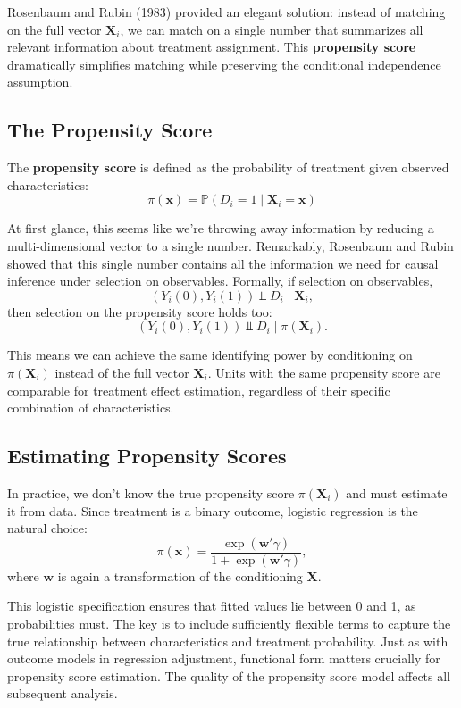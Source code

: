 \documentclass[12pt]{article}
\begin{document}
\begin{multicols}{2}
Rosenbaum and Rubin (1983) provided an elegant solution: instead of matching on the full vector $\bm{X}_i$, we can match on a single number that summarizes all relevant information about treatment assignment.
This \textbf{propensity score} dramatically simplifies matching while preserving the conditional independence assumption.

\subsection*{The Propensity Score}

The \textbf{propensity score} is defined as the probability of treatment given observed characteristics:
$$\pi(\bm{x}) = \mathbb{P}(D_i = 1 \mid \bm{X}_i = \bm{x})$$

At first glance, this seems like we're throwing away information by reducing a multi-dimensional vector to a single number.
Remarkably, Rosenbaum and Rubin showed that this single number contains all the information we need for causal inference under selection on observables.
Formally, if selection on observables, 
$$(Y_i(0), Y_i(1)) \Perp D_i \mid \bm{X}_i,$$ 
then selection on the propensity score holds too: 
$$(Y_i(0), Y_i(1)) \Perp D_i \mid \pi(\bm{X}_i).$$

This means we can achieve the same identifying power by conditioning on $\pi(\bm{X}_i)$ instead of the full vector $\bm{X}_i$.
Units with the same propensity score are comparable for treatment effect estimation, regardless of their specific combination of characteristics.

\subsection*{Estimating Propensity Scores}

In practice, we don't know the true propensity score $\pi(\bm{X}_i)$ and must estimate it from data.
Since treatment is a binary outcome, logistic regression is the natural choice:
$$\pi(\bm{x}) = \frac{\exp(\bm{w}'\gamma)}{1 + \exp(\bm{w}'\gamma)},$$
where $\bm{w}$ is again a transformation of the conditioning $\bm{X}$.

This logistic specification ensures that fitted values lie between 0 and 1, as probabilities must.
The key is to include sufficiently flexible terms to capture the true relationship between characteristics and treatment probability.
Just as with outcome models in regression adjustment, functional form matters crucially for propensity score estimation.
The quality of the propensity score model affects all subsequent analysis.


\end{multicols}
\end{document}
